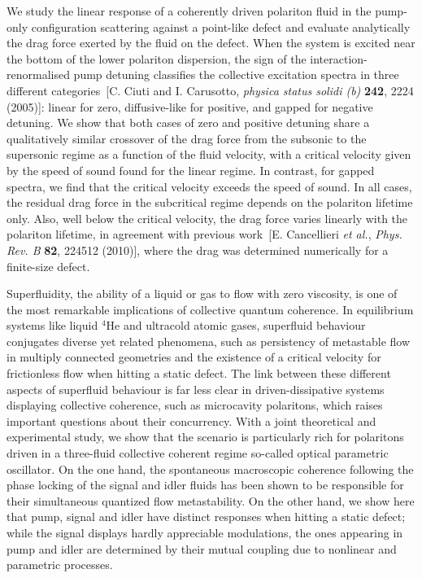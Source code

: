 We study the linear response of a coherently driven polariton fluid
in the pump-only configuration scattering against a point-like defect
and evaluate analytically the drag force exerted by the fluid on the
defect. When the system is excited near the bottom of the lower
polariton dispersion, the sign of the interaction-renormalised pump
detuning classifies the collective excitation spectra in three
different categories~[C. Ciuti and I. Carusotto, \emph{physica status
solidi (b)} \textbf{242}, 2224 (2005)]: linear for zero,
diffusive-like for positive, and gapped for negative detuning. We show
that both cases of zero and positive detuning share a qualitatively
similar crossover of the drag force from the subsonic to the
supersonic regime as a function of the fluid velocity, with a critical
velocity given by the speed of sound found for the linear regime. In
contrast, for gapped spectra, we find that the critical velocity
exceeds the speed of sound. In all cases, the residual drag force in
the subcritical regime depends on the polariton lifetime only. Also,
well below the critical velocity, the drag force varies linearly with
the polariton lifetime, in agreement with previous
work~[E. Cancellieri \emph{et al.}, \emph{Phys. Rev. B} \textbf{82},
224512 (2010)], where the drag was determined numerically for a
finite-size defect.
%

Superfluidity, the ability of a liquid or gas to flow with zero
viscosity, is one of the most remarkable implications of collective
quantum coherence. In equilibrium systems like liquid ${}^4$He and
ultracold atomic gases, superfluid behaviour conjugates diverse yet
related phenomena, such as persistency of metastable flow in multiply
connected geometries and the existence of a critical velocity for
frictionless flow when hitting a static defect.
%
The link between these different aspects of superfluid behaviour is
far less clear in driven-dissipative systems displaying collective
coherence, such as microcavity polaritons, which raises important
questions about their concurrency.
%
With a joint theoretical and experimental study, we show that the
scenario is particularly rich for polaritons driven in a three-fluid
collective coherent regime so-called optical parametric oscillator.
%
On the one hand, the spontaneous macroscopic coherence following the
phase locking of the signal and idler fluids has been shown to be
responsible for their simultaneous quantized flow metastability.
%
On the other hand, we show here that pump, signal and idler have
distinct responses when hitting a static defect; while the signal
displays hardly appreciable modulations, the ones appearing in pump
and idler are determined by their mutual coupling due to nonlinear and
parametric processes.

